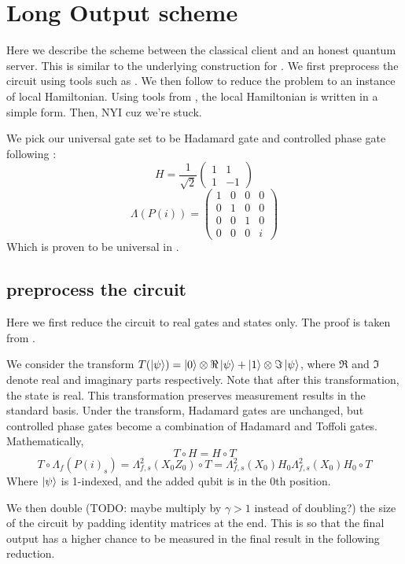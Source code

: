 \section{Long Output scheme}

Here we describe the scheme between the classical client and an honest quantum server. This is similar to the underlying construction for \cite{mahadev_delegation}. We first preprocess the circuit using tools such as \cite{quant-ph/0301040}. We then follow \cite{kitaev2002classical} to reduce the problem to an instance of local Hamiltonian. Using tools from \cite{PhysRevA.93.022326}, the local Hamiltonian is written in a simple form. Then, NYI cuz we're stuck.

We pick our universal gate set to be Hadamard gate and controlled phase gate following \cite{quant-ph/0301040}:
$$H=\frac{1}{\sqrt{2}}\begin{pmatrix}1&1\\1&-1\end{pmatrix}$$
$$\Lambda(P(i))=\begin{pmatrix}1&0&0&0\\0&1&0&0\\0&0&1&0\\0&0&0&i\end{pmatrix}$$
Which is proven to be universal in \cite{kitaev_1997}.

\subsection{preprocess the circuit}

Here we first reduce the circuit to real gates and states only. The proof is taken from \cite{quant-ph/0301040}.

We consider the transform $T(\ket{\psi})=\ket{0}\otimes\Re\ket{\psi}+\ket{1}\otimes\Im\ket{\psi}$, where $\Re$ and $\Im$ denote real and imaginary parts respectively. Note that after this transformation, the state is real. This transformation preserves measurement results in the standard basis. Under the transform, Hadamard gates are unchanged, but controlled phase gates become a combination of Hadamard and Toffoli gates. Mathematically,
$$T\circ H=H\circ T$$
$$T\circ\Lambda_f(P(i)_s)=\Lambda^2_{f,s}(X_0Z_0)\circ T=\Lambda^2_{f,s}(X_0)H_0\Lambda^2_{f,s}(X_0)H_0\circ T$$
Where $\ket{\psi}$ is 1-indexed, and the added qubit is in the 0th position. 

We then double (TODO: maybe multiply by $\gamma>1$ instead of doubling?) the size of the circuit by padding identity matrices at the end. This is so that the final output has a higher chance to be measured in the final result in the following reduction.

